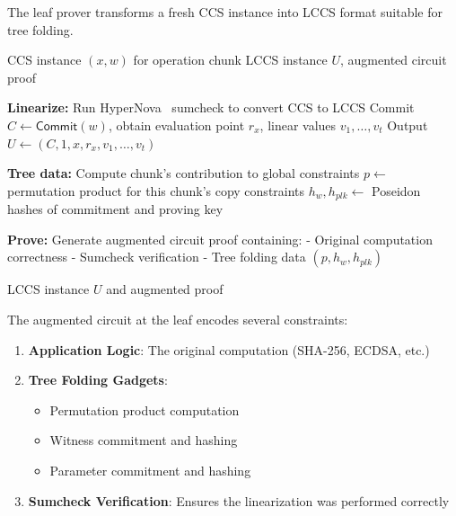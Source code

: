 \documentclass[11pt,a4paper]{article}
\theoremstyle{plain}
\theoremstyle{definition}
\newcommand{\Com}{\mathsf{Commit}}
\begin{document}
The leaf prover transforms a fresh CCS instance into LCCS format suitable for tree folding.

\begin{algorithm}
\caption{Leaf Linearization}
\begin{algorithmic}[1]
\Require CCS instance $(x, w)$ for operation chunk
\Ensure LCCS instance $U$, augmented circuit proof

\State \textbf{Linearize:} Run HyperNova~\cite{hypernova} sumcheck to convert CCS to LCCS
\State \quad Commit $C \leftarrow \Com(w)$, obtain evaluation point $r_x$, linear values $v_1, \ldots, v_t$
\State \quad Output $U \leftarrow (C, 1, x, r_x, v_1, \ldots, v_t)$

\State \textbf{Tree data:} Compute chunk's contribution to global constraints
\State \quad $p \leftarrow$ permutation product for this chunk's copy constraints
\State \quad $h_w, h_{plk} \leftarrow$ Poseidon hashes of commitment and proving key

\State \textbf{Prove:} Generate augmented circuit proof containing:
\State \quad - Original computation correctness
\State \quad - Sumcheck verification
\State \quad - Tree folding data $(p, h_w, h_{plk})$

\State \Return LCCS instance $U$ and augmented proof
\end{algorithmic}
\end{algorithm}

The augmented circuit at the leaf encodes several constraints:

\begin{enumerate}
\item \textbf{Application Logic}: The original computation (SHA-256, ECDSA, etc.)
\item \textbf{Tree Folding Gadgets}:
   \begin{itemize}
   \item Permutation product computation
   \item Witness commitment and hashing
   \item Parameter commitment and hashing
   \end{itemize}
\item \textbf{Sumcheck Verification}: Ensures the linearization was performed correctly
\end{enumerate}
\end{document}
